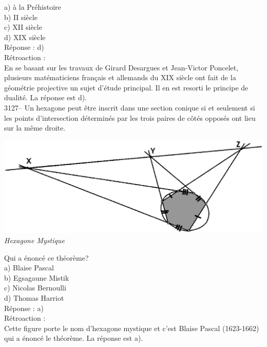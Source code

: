 \documentclass[letterpaper, 12pt]{article}
\begin{document}
a) \`a la Pr\'ehistoire\\
b) {\scriptsize II\ieme{}} si\`ecle\\
c) {\scriptsize XII\ieme{}} si\`ecle\\
d) {\scriptsize XIX\ieme{}} si\`ecle\\

R\'eponse : d)\\

R\'etroaction :\\
En se basant sur les travaux de Girard Desargues et Jean-Victor Poncelet, plusieurs mat\'ematiciens fran\c cais et allemands du {\scriptsize XIX\ieme{}} si\`ecle ont fait de la g\'eom\'etrie projective un sujet d'\'etude principal. Il en est resorti le principe de dualit\'e. La r\'eponse est d).\\



3127-- Un hexagone peut \^etre inscrit dans une section conique si et seulement si les points d'intersection d\'etermin\'es par les trois paires de c\^ot\'es oppos\'es ont lieu sur la m\^eme droite.
\begin{center}
\includegraphics[scale=0.25]{hexagone.eps}\\
\emph{{\small Hexagone Mystique}}\\
\end{center}
Qui a \'enonc\'e ce th\'eor\`eme?\\

a) Blaise Pascal\\
b) Egsagaune Mistik\\
c) Nicolas Bernoulli\\
d) Thomas Harriot\\

R\'eponse : a)\\

R\'etroaction :\\
Cette figure porte le nom d'hexagone mystique et c'est Blaise Pascal (1623-1662) qui a \'enonc\'e le th\'eor\`eme. La r\'eponse est a).\\
\end{document}
